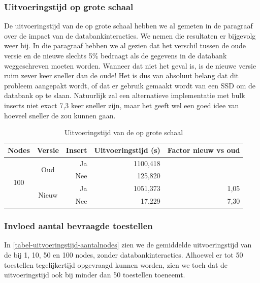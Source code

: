 \subsubsection{Uitvoeringstijd op grote schaal}

De uitvoeringstijd van de \nwmretriever{} op grote schaal hebben we al gemeten in de paragraaf over de impact van de databankinteracties.
We nemen die resultaten er bijgevolg weer bij.
In die paragraaf hebben we al gezien dat het verschil tussen de oude versie en de nieuwe slechts 5\% bedraagt
als de gegevens in de databank weggeschreven moeten worden.
Wanneer dat niet het geval is, is de nieuwe versie ruim zever keer sneller dan de oude!
Het is dus van absoluut belang dat dit probleem aangepakt wordt, of dat er gebruik gemaakt wordt van een SSD om de databank op te slaan.
Natuurlijk zal een alternatieve implementatie met bulk inserts niet exact 7,3 keer sneller zijn, maar het geeft wel een goed idee
van hoeveel sneller de \nwmretriever{} zou kunnen gaan.

\begin{table}[h]
\centering
\begin{tabular}{@{}ccrrr@{}}
\toprule
\multicolumn{1}{l}{Nodes} & \multicolumn{1}{l}{Versie} & Insert & Uitvoeringstijd (s) & Factor nieuw vs oud \\ \midrule
\multirow{4}{*}{100}      & \multirow{2}{*}{Oud}       & Ja     & 1100,418            &                     \\
                          &                            & Nee    & 125,820             &                     \\
                          & \multirow{2}{*}{Nieuw}     & Ja     & 1051,373            & 1,05                \\
                          &                            & Nee    & 17,229              & 7,30                \\ \bottomrule
\end{tabular}
\caption{Uitvoeringstijd van de \nwmretriever{} op grote schaal}
\label{tabel-uitvoeringstijd-vwall}
\end{table}

\subsubsection{Invloed aantal bevraagde toestellen}

In \cref{tabel-uitvoeringstijd-aantalnodes} zien we de gemiddelde uitvoeringstijd van de \nwmretriever{} bij 1, 10, 50 en 100 nodes, zonder databankinteracties.
Alhoewel er tot 50 toestellen tegelijkertijd opgevraagd kunnen worden, zien we toch dat de uitvoeringstijd ook bij minder dan 50 toestellen toeneemt.

